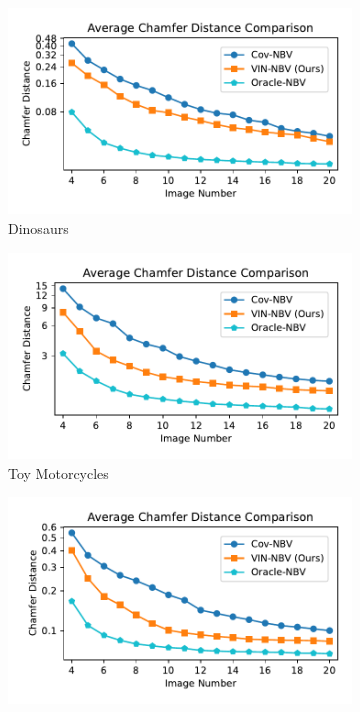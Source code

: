 \begin{figure}[!t]
  \centering
  \vspace{-1.0em}
  \begin{subfigure}[t]{0.33\textwidth}
    \centering
    \includegraphics[width=\textwidth]{Figures/dino_combined_chamfer.pdf}
    \caption{Dinosaurs}
    \label{fig:dinosaur_chamf}
  \end{subfigure}
  \hfill
  \begin{subfigure}[t]{0.33\textwidth}
    \centering
    \includegraphics[width=\textwidth]{Figures/motorcycle_combined_chamfer.pdf}
    \caption{Toy Motorcycles}
    \label{fig:motorcycle_chamf}
  \end{subfigure}
  \hfill
  \begin{subfigure}[t]{0.33\textwidth}
    \centering
    \includegraphics[width=\textwidth]{Figures/animal_combined_chamfer.pdf}

\end{subfigure}
\end{figure}
